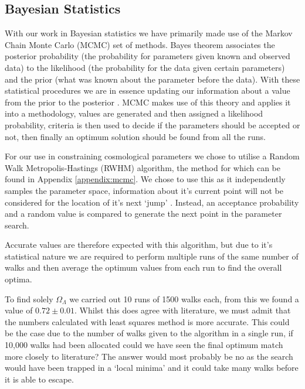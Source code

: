 \documentclass[twocolumn]{revtex4}
\begin{document}
{\vspace{-3ex}
\subsection{Bayesian Statistics} 
\vspace{-2ex}
With our work in Bayesian statistics we have primarily made use of the Markov Chain Monte Carlo (MCMC) set of methods. Bayes theorem associates the posterior probability (the probability for parameters given known and observed data) to the likelihood (the probability for the data given certain parameters) and the prior (what was known about the parameter before the data). With these statistical procedures we are in essence updating our information about a value from the prior to the posterior \cite{mcmc_bs}. MCMC makes use of this theory and applies it into a methodology, values are generated and then assigned a likelihood probability, criteria is then used to decide if the parameters should be accepted or not, then finally an optimum solution should be found from all the runs.

For our use in constraining cosmological parameters we chose to utilise a Random Walk Metropolis-Hastings (RWHM) algorithm, the method for which can be found in Appendix \ref{appendix:mcmc}. We chose to use this as it independently samples the parameter space, information about it's current point will not be considered for the location of it's next `jump' \cite{mcmc_bs}. Instead, an acceptance probability and a random value is compared to generate the next point in the parameter search.

Accurate values are therefore expected with this algorithm, but due to it's statistical nature we are required to perform multiple runs of the same number of walks and then average the optimum values from each run to find the overall optima.

To find solely $\Omega_\Lambda$ we carried out 10 runs of 1500 walks each, from this we found a value of $0.72\pm0.01$. Whilst this does agree with literature, we must admit that the numbers calculated with least squares method is more accurate. This could be the case due to the number of walks given to the algorithm in a single run, if 10,000 walks had been allocated could we have seen the final optimum match more closely to literature? The answer would most probably be no as the search would have been trapped in a `local minima' and it could take many walks before it is able to escape. 

}
\end{document}
